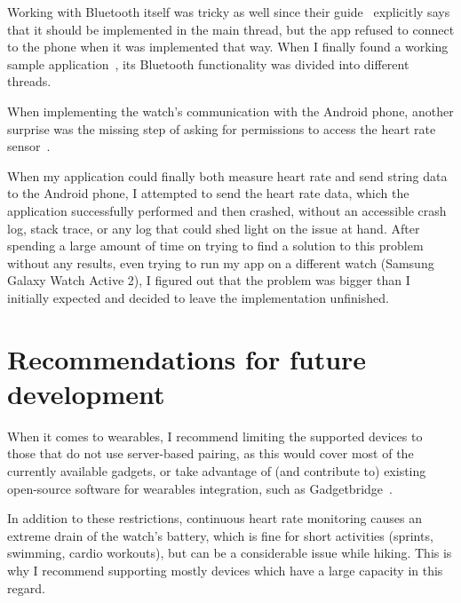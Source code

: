 Working with Bluetooth itself was tricky as well since their guide~\cite{tizen_bluetooth_guide} explicitly says that it should be implemented in the main thread,
but the app refused to connect to the phone when it was implemented that way.
When I finally found a working sample application~\cite{tizen_bluetooth_sample}, its Bluetooth functionality was divided into different threads.

When implementing the watch's communication with the Android phone, another surprise was the missing step of asking for permissions to access the heart rate sensor~\cite{tizen_sensor_tutorial}.

When my application could finally both measure heart rate and send string data to the Android phone, I attempted to send the heart rate data,
which the application successfully performed and then crashed, without an accessible crash log, stack trace, or any log that could shed light on the issue at hand.
After spending a large amount of time on trying to find a solution to this problem without any results, even trying to run my app on a different watch (Samsung Galaxy Watch Active 2), I figured out that the problem was bigger than I initially expected and decided to leave the implementation unfinished.

\section{Recommendations for future development}
When it comes to wearables, I recommend limiting the supported devices to those that do not use server-based pairing, as this would cover most of the currently available gadgets,
or take advantage of (and contribute to) existing open-source software for wearables integration, such as Gadgetbridge~\cite{Gadgetbridge}.

In addition to these restrictions, continuous heart rate monitoring causes an extreme drain of the watch's battery,
which is fine for short activities (sprints, swimming, cardio workouts), but can be a considerable issue while hiking.
This is why I recommend supporting mostly devices which have a large capacity in this regard.

